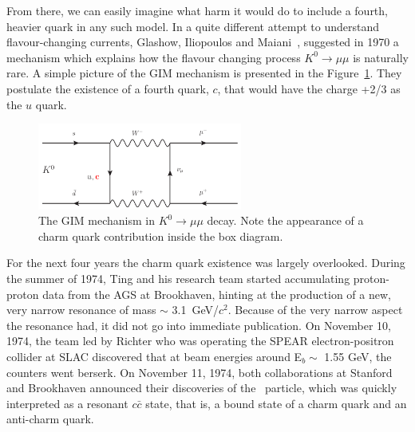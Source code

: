 From there, we can easily imagine what harm it would do to include a
fourth, heavier quark in any such model. In a quite different attempt
to understand flavour-changing currents, Glashow, Iliopoulos and
Maiani~\cite{GIM_mechanism}, suggested in 1970 a mechanism which explains how
the flavour changing process $K^{0}\to \mu\mu$ is naturally rare. A
simple picture of the GIM mechanism is presented in the
Figure~\ref{fig:GIM}. They postulate the existence of a fourth quark,
$c$, that would have the charge +2/3 as the $u$ quark.

\begin{figure}
\begin{center}
  \includegraphics[width=0.6\textwidth]{Chapters/pQCD/GIM.pdf}
 \caption{The GIM mechanism in $K^{0}\to \mu\mu$ decay. Note the
   appearance of a charm quark contribution inside the box diagram.}
 \label{fig:GIM}
\end{center}
\end{figure}


For the next four years the charm quark existence was largely
overlooked. During the summer of 1974, Ting and his research team
started accumulating proton-proton data from the AGS at Brookhaven, hinting at the production of a new, very narrow
resonance of mass $\sim$ 3.1~GeV/$c^2$. Because of the very narrow aspect
the resonance had, it did not go into immediate publication. On
November 10, 1974, the team led by Richter who was operating the SPEAR
electron-positron collider at SLAC discovered that at beam energies
around E$_{b} \sim$ 
1.55 GeV, the counters went berserk. On November 11, 1974, both
collaborations at Stanford and Brookhaven announced their discoveries
of the \Jpsi~particle, which was quickly interpreted as a resonant
$c\bar{c}$ state, that is, a bound state of a charm quark and an anti-charm quark.

